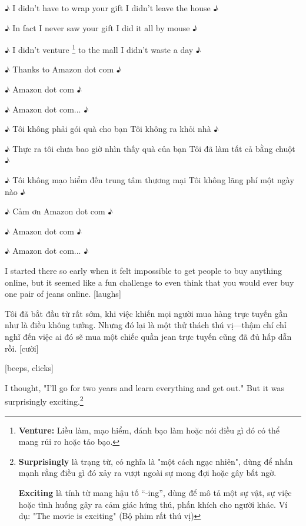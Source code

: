 \documentclass[a4paper]{article}
\begin{document}
	
	♪ I didn't have to wrap your gift I didn't leave the house ♪
	
	♪ In fact I never saw your gift I did it all by mouse ♪
	
	♪ I didn't venture \footnote{
		\textbf{Venture:} Liều làm, mạo hiểm, đánh bạo làm hoặc nói điều gì đó có thể mang rủi ro hoặc táo bạo.
	
	
	} to the mall I didn't waste a day ♪
	
	♪ Thanks to Amazon dot com ♪
	
	♪ Amazon dot com ♪
	
	♪ Amazon dot com... ♪
	
	\begin{vietnamese-v2}
		♪ Tôi không phải gói quà cho bạn Tôi không ra khỏi nhà ♪
		
		♪ Thực ra tôi chưa bao giờ nhìn thấy quà của bạn Tôi đã làm tất cả bằng chuột ♪
		
		♪ Tôi không mạo hiểm đến trung tâm thương mại Tôi không lãng phí một ngày nào ♪
		
		♪ Cảm ơn Amazon dot com ♪
		
		♪ Amazon dot com ♪
		
		♪ Amazon dot com... ♪
	\end{vietnamese-v2}
	
	I started there so early when it felt impossible to get people to buy anything online, but it seemed like a fun challenge to even think that you would ever buy one pair of jeans online. [laughs]		
	
	\begin{vietnamese-v2}
		Tôi đã bắt đầu từ rất sớm, khi việc khiến mọi người mua hàng trực tuyến gần như là điều không tưởng. 
		Nhưng đó lại là một thử thách thú vị—thậm chí chỉ nghĩ đến việc ai đó sẽ mua một chiếc quần jean trực tuyến cũng đã đủ hấp dẫn rồi. [cười]
	\end{vietnamese-v2}
	
	[beeps, clicks]

	I thought, "I'll go for two years and learn everything and get out." But it was surprisingly exciting.\footnote{
		\textbf{Surprisingly} là trạng từ, có nghĩa là "một cách ngạc nhiên", dùng để nhấn mạnh rằng điều gì đó xảy ra vượt ngoài sự mong đợi hoặc gây bất ngờ.
	
		\textbf{Exciting} là tính từ mang hậu tố “-ing”, dùng để mô tả một sự vật, sự việc hoặc tình huống gây ra cảm giác hứng thú, phấn khích cho người khác. Ví dụ: "The movie is exciting" (Bộ phim rất thú vị)
	}
\end{document}

